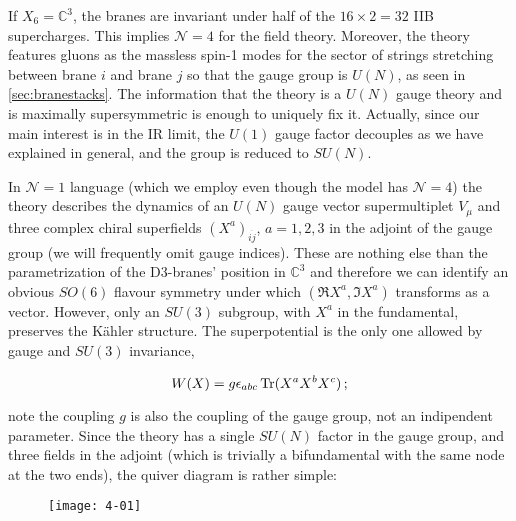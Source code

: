 If $X_6 = \mathbb{C}^3$, the branes are invariant under half of the $16 \times 2 = 32$ IIB supercharges. This implies $\mathcal{N}=4$ for the field theory. Moreover, the theory features gluons as the massless spin-1 modes for the sector of strings stretching between brane $i$ and brane $j$ so that the gauge group is $U(N)$, as seen in \ref{sec:branestacks}. The information that the theory is a $U(N)$ gauge theory and is maximally supersymmetric is enough to uniquely fix it. Actually, since our main interest is in the IR limit, the $U(1)$ gauge factor decouples as we have explained in general, and the group is reduced to $SU(N)$.

In $\mathcal{N}=1$ language (which we employ even though the model has $\mathcal{N}=4$) the theory describes the dynamics of an $U(N)$ gauge vector supermultiplet $V_\mu$ and three complex chiral superfields $(X^a)_{i\dot j}$, $a=1,2,3$ in the adjoint of the gauge group (we will frequently omit gauge indices). These are nothing else than the parametrization of the D3-branes' position in $\mathbb{C}^3$ and therefore we can identify an obvious $SO(6)$ flavour symmetry under which $(\Re X^a, \Im X^a)$ transforms as a vector. However, only an $SU(3)$ subgroup, with $X^a$ in the fundamental, preserves the K\"ahler structure. The superpotential is the only one allowed by gauge and $SU(3)$ invariance,

\begin{equation} W(X) = g \epsilon_{abc} \operatorname{Tr} ( X^a X^b X^c) \label{sym4potential}\,;
\end{equation}

note the coupling $g$ is also the coupling of the gauge group, not an indipendent parameter. Since the theory has a single $SU(N)$ factor in the gauge group, and three fields in the adjoint (which is trivially a bifundamental with the same node at the two ends), the quiver diagram is rather simple:


\begin{figure}[H]
	\centering
	\texttt{[image: 4-01]}
\end{figure}

